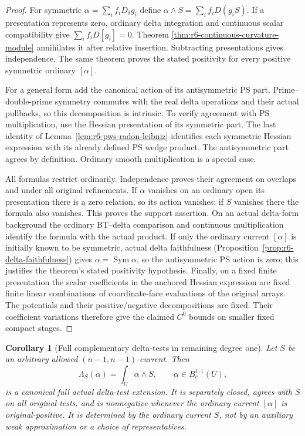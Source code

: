 \documentclass[11pt,a4paper]{article}
\numberwithin{equation}{section}
\newtheorem{corollary}[theorem]{Corollary}
\theoremstyle{definition}
\theoremstyle{remark}
\begin{document}
\begin{proof}
For symmetric $\alpha=\sum_i f_iD_\delta g_i$ define
$\alpha\wedge S=\sum_i f_iD(g_iS)$.  If a presentation represents
zero, ordinary delta integration and continuous scalar compatibility
give $\sum_i f_iD[g_i]=0$.  Theorem
\ref{thm:r6-continuous-curvature-module} annihilates it after relative
insertion.  Subtracting presentations gives independence.  The same
theorem proves the stated positivity for every positive symmetric
ordinary $[\alpha]$.

For a general form add the canonical action of its antisymmetric
PS part.  Prime--double-prime symmetry commutes with the real delta
operations and their actual pullbacks, so this decomposition is
intrinsic.  To verify agreement with PS multiplication, use the
Hessian presentation of its symmetric part.  The last identity of
Lemma~\ref{lem:r6-pws-radon-leibniz} identifies each symmetric
Hessian expression with its already defined PS wedge product.
The antisymmetric part agrees by definition.  Ordinary smooth
multiplication is a special case.

All formulas restrict ordinarily.  Independence proves their
agreement on overlaps and under all original refinements.  If
$\alpha$ vanishes on an ordinary open its presentation there is a
zero relation, so its action vanishes; if $S$ vanishes there the
formula also vanishes.  This proves the support assertion.  On an
actual delta-form background the ordinary BT--delta comparison and
continuous multiplication identify the formula with the actual
product.  If only the ordinary current $[\alpha]$ is initially
known to be symmetric, actual delta faithfulness
(Proposition~\ref{prop:r6-delta-faithfulness}) gives
$\alpha=\operatorname{Sym}\alpha$, so the antisymmetric PS action
is zero; this justifies the theorem's stated positivity hypothesis.
Finally, on a fixed finite presentation the scalar
coefficients in the anchored Hessian expression are fixed finite
linear combinations of coordinate-face evaluations of the original
arrays.  The potentials and their positive/negative decompositions
are fixed.  Their coefficient variations therefore give the claimed
$C^0$ bounds on smaller fixed compact stages.
\end{proof}

\begin{corollary}[Full complementary delta-tests in remaining degree one]
\label{cor:r6-all-background-qone-full-delta}
Let $S$ be an arbitrary allowed $(n-1,n-1)$-current.  Then
\[
                  \Lambda_S(\alpha)=\int_U\alpha\wedge S,
                  \qquad \alpha\in B_c^{1,1}(U),
\]
is a canonical full actual delta-test extension.  It is separately
closed, agrees with $S$ on all original tests, and is nonnegative
whenever the ordinary current $[\alpha]$ is original-positive.
It is determined by the ordinary current $S$, not by an auxiliary
weak approximation or a choice of representatives.
\end{corollary}
\end{document}

